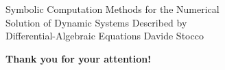 \begin{frame}[plain]{%
  Symbolic Computation Methods for the Numerical \\%
  Solution of Dynamic Systems Described by \\%
  Differential-Algebraic Equations
  }{Davide Stocco}
  \vfill
  \raggedright{\selectfont\huge\color{tx_sl_color}\bfseries{Thank you for your attention!}} \\[0.5em]
\end{frame}

